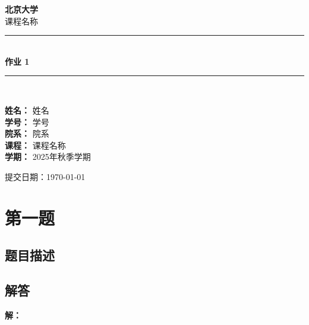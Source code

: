 \documentclass[12pt,a4paper]{article}
\newcommand{\coursename}{课程名称}         %
\newcommand{\hwnum}{1}                     %
\newcommand{\studentname}{姓名}            %
\newcommand{\studentid}{学号}              %
\newcommand{\department}{院系}             %
\newcommand{\semester}{2025年秋季学期}     %
\numberwithin{equation}{section}
\newcommand{\solution}{\textbf{解：}}
\begin{document}
\begin{titlepage}
    \centering
    \vspace*{2cm}

    {\LARGE \textbf{北京大学}}\\[1cm]
    {\Large \coursename}\\[1.5cm]

    \rule{\linewidth}{0.5mm}\\[0.4cm]
    {\huge \textbf{作业 \hwnum}}\\[0.4cm]
    \rule{\linewidth}{0.5mm}\\[1.5cm]

    \begin{minipage}{0.6\textwidth}
        \begin{flushleft}
            \large
            \textbf{姓名：} \studentname\\
            \textbf{学号：} \studentid\\
            \textbf{院系：} \department\\
            \textbf{课程：} \coursename\\
            \textbf{学期：} \semester
        \end{flushleft}
    \end{minipage}

    \vfill

    {\large 提交日期：\today}

\end{titlepage}

\tableofcontents
\newpage


\section{第一题}

\subsection{题目描述}

\subsection{解答}

\solution
\end{document}
